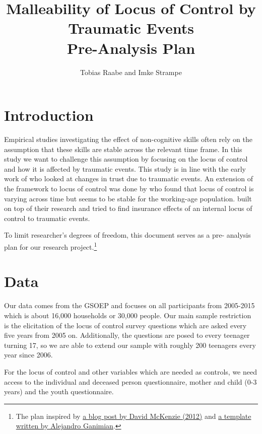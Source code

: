 \documentclass{scrartcl}
\author{Tobias Raabe and Imke Strampe}
\title{Malleability of Locus of Control by Traumatic Events\\[0.5cm]
\Large Pre-Analysis Plan}
\begin{document}
\maketitle

\section{Introduction} %
\label{sec:introduction}

Empirical studies investigating the effect of non-cognitive skills often rely on the
assumption that these skills are stable across the relevant time frame. In this study we
want to challenge this assumption by focusing on the locus of control and how it is
affected by traumatic events. This study is in line with the early work of
\citet{alesina2002} who looked at changes in trust due to traumatic events. An extension
of the framework to locus of control was done by \citet{cobb2013} who found that locus
of control is varying across time but seems to be stable for the working-age population.
\citet{buddelmeyer2016} built on top of their research and tried to find insurance
effects of an internal locus of control to traumatic events.

To limit researcher's degrees of freedom, this document serves as a pre- analysis plan
for our research project.\footnote{The plan inspired by
\href{https://blogs.worldbank.org/impactevaluations/a-pre-analysis-plan- checklist}{a
blog post by David McKenzie (2012)} and
\href{http://cega.berkeley.edu/assets/cega_events/92/Pre-Analysis_Plan_Template_Alejandro_Ganimian.pdf}{a
template written by Alejandro Ganimian}.}


\section{Data} %
\label{sec:data}

Our data comes from the GSOEP and focuses on all participants from 2005-2015 which is
about 16,000 households or 30,000 people. Our main sample restriction is the elicitation
of the locus of control survey questions which are asked every five years from 2005 on.
Additionally, the questions are posed to every teenager turning 17, so we are able to
extend our sample with roughly 200 teenagers every year since 2006.

For the locus of control and other variables which are needed as controls, we need
access to the individual and deceased person questionnaire, mother and child (0-3 years)
and the youth questionnaire.
\end{document}
